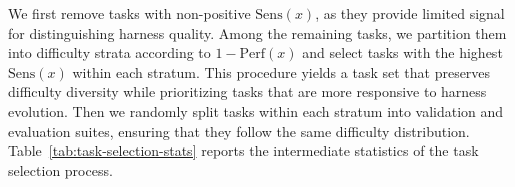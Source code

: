 
We first remove tasks with non-positive $\mathrm{Sens}(x)$, as they provide limited signal for distinguishing harness quality. Among the remaining tasks, we partition them into difficulty strata according to $1-\mathrm{Perf}(x)$ and select tasks with the highest $\mathrm{Sens}(x)$ within each stratum. This procedure yields a task set that preserves difficulty diversity while prioritizing tasks that are more responsive to harness evolution. Then we randomly split tasks within each stratum into validation and evaluation suites, ensuring that they follow the same difficulty distribution. Table~\ref{tab:task-selection-stats} reports the intermediate statistics of the task selection process.



